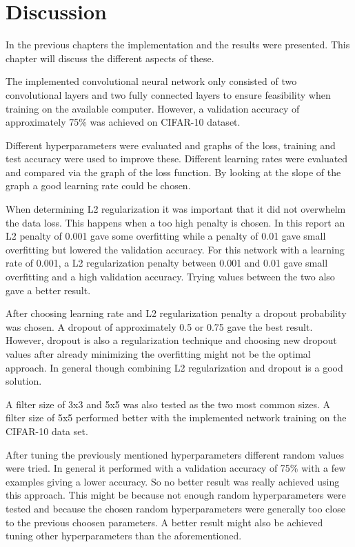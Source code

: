 \chapter{Discussion}
\label{chp:disc}

In the previous chapters the implementation and the results were presented. This chapter will discuss the different aspects of these.

The implemented convolutional neural network only consisted of two convolutional layers and two fully connected layers to ensure feasibility when training on the available computer. However, a validation accuracy of approximately 75\% was achieved on CIFAR-10 dataset.

Different hyperparameters were evaluated and graphs of the loss, training and test accuracy were used to improve these. Different learning rates were evaluated and compared via the graph of the loss function. By looking at the slope of the graph a good learning rate could be chosen.

When determining L2 regularization it was important that it did not overwhelm the data loss. This happens when a too high penalty is chosen. In this report an L2 penalty of 0.001 gave some overfitting while a penalty of 0.01 gave small overfitting but lowered the validation accuracy. For this network with a learning rate of 0.001, a L2 regularization penalty between 0.001 and 0.01 gave small overfitting and a high validation accuracy. Trying values between the two also gave a better result.

After choosing learning rate and L2 regularization penalty a dropout probability was chosen. A dropout of approximately 0.5 or 0.75 gave the best result. However, dropout is also a regularization technique and choosing new dropout values after already minimizing the overfitting might not be the optimal approach. In general though combining L2 regularization and dropout is a good solution. 

A filter size of 3x3 and 5x5 was also tested as the two most common sizes. A filter size of 5x5 performed better with the implemented network training on the CIFAR-10 data set.

After tuning the previously mentioned hyperparameters different random values were tried. In general it performed with a validation accuracy of 75\% with a few examples giving a lower accuracy. So no better result was really achieved using this approach. This might be because not enough random hyperparameters were tested and because the chosen random hyperparameters were generally too close to the previous choosen parameters. A better result might also be achieved tuning other hyperparameters than the aforementioned.

